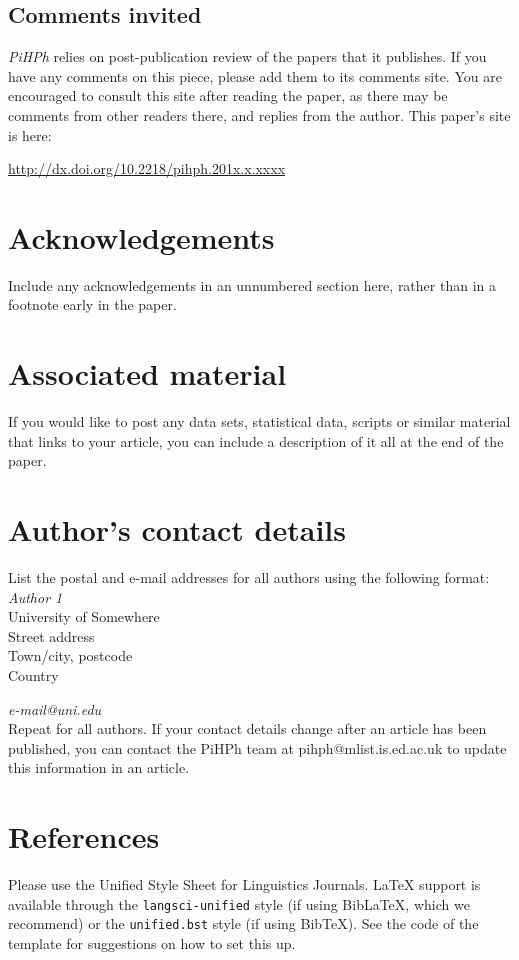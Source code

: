 \documentclass[article, a4paper, 12pt]{memoir}
\newcommand\thisdoi{10.2218/pihph.201x.x.xxxx}
\newcommand\thisdoilink{http://dx.doi.org/\thisdoi}
\newcommand\commentsinvited{
\begin{tcdoublebox}

\section*{\textcolor{pihphgreen}{Comments invited}}

\textit{PiHPh} relies on post-publication review of the papers that it publishes. If you have any comments on this piece, please add them to its comments site. You are encouraged to consult this site after reading the paper, as there may be comments from other readers there, and replies from the author. This paper's site is here:

\vspace*{1ex}\noindent \url{\thisdoilink}

\end{tcdoublebox}
}
\begin{document}
\commentsinvited %

\section*{Acknowledgements}
\label{sec:acknowledgements}


Include any acknowledgements in an unnumbered section here, rather than in a footnote early in the paper.

\section*{Associated material}
\label{sec:associated-material}

If you would like to post any data sets, statistical data, scripts or similar material that links to your article, you can include a description of it all at the end of the paper.

\section*{Author's contact details}
\label{sec:auth-cont-deta}

List the postal and e-mail addresses for all authors using the following format:\\

\noindent \textit{Author 1}\\
University of Somewhere\\
Street address\\
Town/city, postcode\\
Country

\vspace*{5pt}
\noindent \textit{e-mail@uni.edu}\\

\noindent Repeat for all authors. If your contact details change after an article has been published, you can contact the PiHPh team at pihph@mlist.is.ed.ac.uk to update this information in an article.


\section*{References}
\label{sec:references}

Please use the Unified Style Sheet for Linguistics Journals. \LaTeX{} support is available through the \texttt{langsci-unified} style (if using Bib\LaTeX, which we recommend) or the \texttt{unified.bst} style (if using Bib\TeX). See the code of the template for suggestions on how to set this up.





\printbibliography[title=References]

%  
\end{document}
